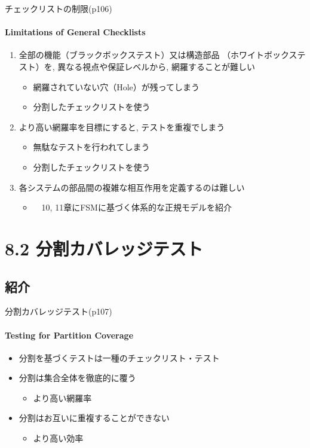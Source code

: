 \begin{frame}{チェックリストの制限(p106)}
\framesubtitle{Limitations of General Checklists}
\begin{enumerate}
\item 全部の機能（ブラックボックステスト）又は構造部品
（ホワイトボックステスト）を, 異なる視点や保証レベルから, 
網羅することが難しい
    \begin{itemize}
    \item 網羅されていない穴（Hole）が残ってしまう
    \item<uncover@3-|alert@3> 分割したチェックリストを使う
    \end{itemize}
\item より高い網羅率を目標にすると, テストを重複でしまう
    \begin{itemize}
    \item 無駄なテストを行われてしまう
    \item<uncover@3-|alert@3> 分割したチェックリストを使う
    \end{itemize}
\item 各システムの部品間の複雑な相互作用を定義するのは難しい
    \begin{itemize}
    \item<uncover@2-|alert@2>　10, 11章にFSMに基づく体系的な正規モデルを紹介
     
    \end{itemize}
\end{enumerate}
\end{frame}
\section{8.2 分割カバレッジテスト}
\subsection{紹介}
\begin{frame}{分割カバレッジテスト(p107)}
\framesubtitle{Testing for Partition Coverage}
\begin{itemize}
\item 分割を基づくテストは一種のチェックリスト・テスト
\item 分割は集合全体を徹底的に覆う　 
    \begin{itemize}
    \item より高い\alert{網羅率}
    \end{itemize}
\item 分割はお互いに重複することができない
    \begin{itemize}
    \item より高い\alert{効率}
    \end{itemize}
\end{itemize}
\end{frame}
